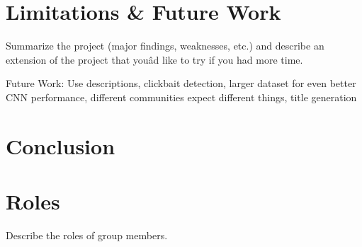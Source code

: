 \documentclass[a4paper,12pt]{article}
\begin{document}
\section{Limitations \& Future Work}
Summarize the project (major findings, weaknesses, etc.) and describe an extension
of the project that youâd like to try if you had more time.

Future Work: Use descriptions, clickbait detection, larger dataset for even better CNN performance, different communities expect different things, title generation

\section{Conclusion}




\appendix
\section{Roles}
Describe the roles of group members.
\end{document}
